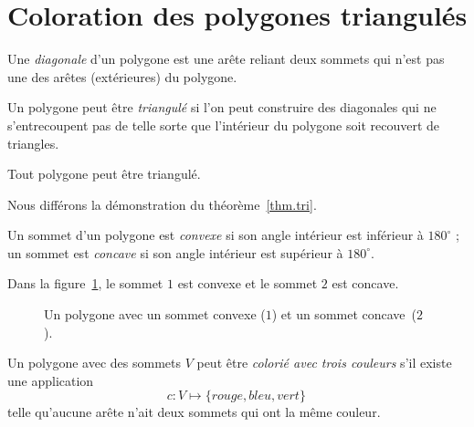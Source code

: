 \section{Coloration des polygones triangulés}\label{s.museum-triangulating}

\begin{definition}
Une \emph{diagonale} d'un polygone est une arête reliant deux sommets qui n'est pas une des arêtes (extérieures) du polygone.
\end{definition}

\begin{definition} Un polygone peut être \emph{triangulé} si l'on peut construire des diagonales qui ne s'entrecoupent pas de telle sorte que l'intérieur du polygone soit recouvert de triangles.
\end{definition}
\vspace{-2ex}
\begin{theorem}
Tout polygone peut être triangulé.\label{thm.tri}
\end{theorem}
Nous différons la démonstration du théorème~\ref{thm.tri}.
\begin{definition}
Un sommet d'un polygone est \emph{convexe} si son angle intérieur est inférieur à $180^\circ$ ; un sommet est \emph{concave} si son angle intérieur est supérieur à $180^\circ$. 
\end{definition}
Dans la  figure~\ref{f.museum.arbitrary}, le sommet $1$ est convexe et le sommet $2$ est concave.

\begin{figure}[htbp]
\centering
{}
\caption{Un polygone avec un sommet convexe ($1$) et un sommet concave~($2$).}
\label{f.museum.arbitrary}
\end{figure}

\begin{definition}
Un polygone avec des sommets $V$ peut être \emph{colorié avec trois couleurs} s'il existe une application 
\[c: V \mapsto \{\mathit{rouge},\mathit{bleu},\mathit{vert}\}\,\] 
telle qu'aucune arête n'ait deux sommets qui ont la même couleur.
\end{definition}

